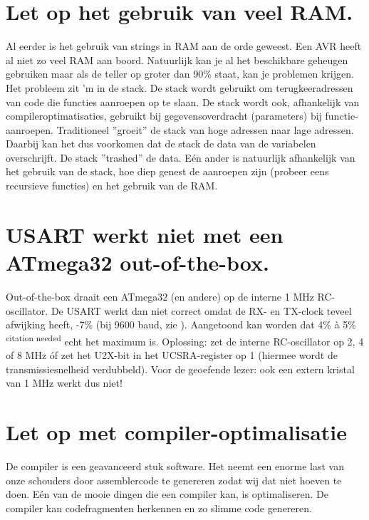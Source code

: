 \documentclass[12pt,a4paper,final,twoside,fleqn]{article}
\begin{document}
\section{Let op het gebruik van veel RAM.}
Al eerder is het gebruik van strings in RAM aan de orde geweest. Een AVR heeft al
niet zo veel RAM aan boord. Natuurlijk kan je al het beschikbare geheugen gebruiken
maar als de teller op groter dan 90\% staat, kan je problemen krijgen. Het probleem
zit 'm in de stack. De stack wordt gebruikt om terugkeeradressen van code die functies
%
aanroepen op te slaan. De stack wordt ook, afhankelijk van compileroptimatisaties,
gebruikt bij gegevensoverdracht (parameters) bij functie-aanroepen. Traditioneel
''groeit'' de stack van hoge adressen naar lage adressen. Daarbij kan het dus
voorkomen dat de stack de data van de variabelen overschrijft. De stack ''trashed''
de data.
E\'{e}n ander is natuurlijk afhankelijk van het gebruik van de stack, hoe diep genest
de aanroepen zijn (probeer eens recursieve functies) en het gebruik van de RAM.

\section{USART werkt niet met een ATmega32 out-of-the-box.}
Out-of-the-box draait een ATmega32 (en andere) op de interne 1 MHz RC-oscillator.
De USART werkt dan niet correct omdat de RX- en TX-clock teveel afwijking heeft, -7\%
(bij 9600 baud, zie \cite{atmega32doc2503}). Aangetoond kan worden dat 4\% \`{a} 5\%
\textsuperscript{citation needed} echt het maximum is. 
Oplossing: zet de interne RC-oscillator op 2, 4 of 8 MHz \'{o}f zet het U2X-bit in het
UCSRA-register op 1 (hiermee wordt de transmissiesnelheid verdubbeld). Voor de geoefende lezer:
ook een extern kristal van 1 MHz werkt dus niet!

\section{Let op met compiler-optimalisatie}
\label{sec:compopt}
De compiler is een geavanceerd stuk software. Het neemt een enorme last van onze schouders
door assemblercode te genereren zodat wij dat niet hoeven te doen. E\'{e}n van de mooie
dingen die een compiler kan, is optimaliseren. De compiler kan codefragmenten herkennen
en zo slimme code genereren.
\end{document}
